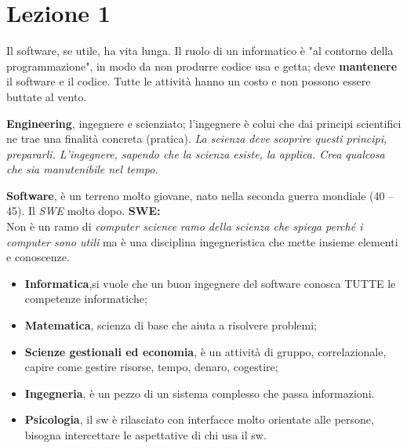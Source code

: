





\section{Lezione 1}


Il software, se utile, ha vita lunga.
Il ruolo di un informatico è "al contorno della programmazione", in modo da non produrre codice usa e getta; deve \textbf{mantenere} il software e il codice. Tutte le attività hanno un costo e non possono essere buttate al vento.

\textbf{Engineering}, ingegnere e scienziato; l'ingegnere è colui che dai principi scientifici ne trae una finalità concreta (pratica).\textit{ La scienza deve scoprire questi principi, prepararli. L'ingegnere, sapendo che la scienza esiste, la applica. Crea qualcosa che sia manutenibile nel tempo.}

\textbf{Software}, è un terreno molto giovane, nato nella seconda guerra mondiale (40 – 45). Il \textit{SWE} molto dopo.
\textbf{SWE:} \\
 Non è un ramo di \textit{computer science} \textit{ramo della scienza che spiega perché i computer sono utili} ma è una disciplina ingegneristica che mette insieme elementi e conoscenze.

\begin{itemize}

	\item \textbf{Informatica},si vuole che un buon ingegnere del software conosca TUTTE le competenze informatiche;
	\item \textbf{Matematica}, scienza di base che aiuta a risolvere problemi;
	\item \textbf{Scienze gestionali ed economia}, è un attività di gruppo, correlazionale, capire come gestire risorse, tempo, denaro, cogestire;
	\item \textbf{Ingegneria}, è un pezzo di un sistema complesso che passa informazioni.
	\item \textbf{Psicologia}, il sw è rilasciato con interfacce molto orientate alle persone, bisogna intercettare le aspettative di chi usa il sw.

\end{itemize}

